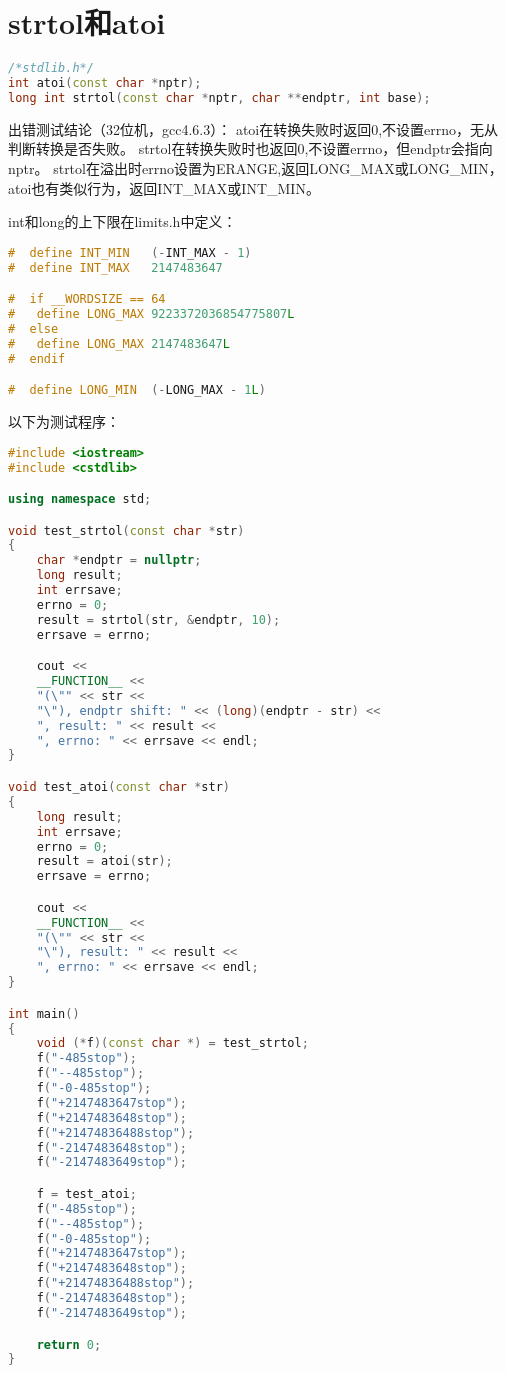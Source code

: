 \section{strtol和atoi}
\begin{lstlisting}[language=C++]
/*stdlib.h*/
int atoi(const char *nptr);
long int strtol(const char *nptr, char **endptr, int base);
\end{lstlisting}

出错测试结论（32位机，gcc4.6.3）：
atoi在转换失败时返回0,不设置errno，无从判断转换是否失败。
strtol在转换失败时也返回0,不设置errno，但endptr会指向nptr。
strtol在溢出时errno设置为ERANGE,返回LONG\_MAX或LONG\_MIN，atoi也有类似行为，返回INT\_MAX或INT\_MIN。

int和long的上下限在limits.h中定义：
\begin{lstlisting}[language=C++]
#  define INT_MIN	(-INT_MAX - 1)
#  define INT_MAX	2147483647

#  if __WORDSIZE == 64
#   define LONG_MAX	9223372036854775807L
#  else
#   define LONG_MAX	2147483647L
#  endif

#  define LONG_MIN	(-LONG_MAX - 1L)
\end{lstlisting}

以下为测试程序：
\begin{lstlisting}[language=C++]
#include <iostream>
#include <cstdlib>

using namespace std;

void test_strtol(const char *str)
{
    char *endptr = nullptr;
    long result;
    int errsave;
    errno = 0;
    result = strtol(str, &endptr, 10);
    errsave = errno;

    cout << 
	__FUNCTION__ << 
	"(\"" << str << 
	"\"), endptr shift: " << (long)(endptr - str) << 
	", result: " << result << 
	", errno: " << errsave << endl;
}

void test_atoi(const char *str)
{
    long result;
    int errsave;
    errno = 0;
    result = atoi(str);
    errsave = errno;

    cout << 
	__FUNCTION__ << 
	"(\"" << str << 
	"\"), result: " << result << 
	", errno: " << errsave << endl;
}

int main()
{
    void (*f)(const char *) = test_strtol;
    f("-485stop");
    f("--485stop");
    f("-0-485stop");
    f("+2147483647stop");
    f("+2147483648stop");
    f("+21474836488stop");
    f("-2147483648stop");
    f("-2147483649stop");

    f = test_atoi;
    f("-485stop");
    f("--485stop");
    f("-0-485stop");
    f("+2147483647stop");
    f("+2147483648stop");
    f("+21474836488stop");
    f("-2147483648stop");
    f("-2147483649stop");

    return 0;
}
\end{lstlisting}

